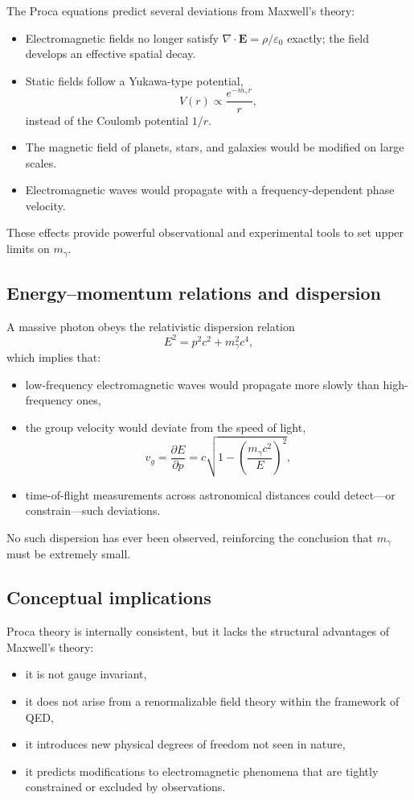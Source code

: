 The Proca equations predict several deviations from Maxwell’s theory:
\begin{itemize}
	\item Electromagnetic fields no longer satisfy $\nabla \cdot \mathbf{E} = \rho / \varepsilon_0$ 
	exactly; the field develops an effective spatial decay.
	\item Static fields follow a Yukawa-type potential,
	\[
	V(r) \propto \frac{e^{-m_\gamma r}}{r},
	\]
	instead of the Coulomb potential $1/r$.
	\item The magnetic field of planets, stars, and galaxies would be 
	modified on large scales.
	\item Electromagnetic waves would propagate with a frequency-dependent 
	phase velocity.
\end{itemize}

These effects provide powerful observational and experimental tools to 
set upper limits on $m_\gamma$.

\subsection*{Energy--momentum relations and dispersion}

A massive photon obeys the relativistic dispersion relation
\[
E^2 = p^2 c^2 + m_\gamma^2 c^4,
\]
which implies that:
\begin{itemize}
	\item low-frequency electromagnetic waves would propagate more slowly 
	than high-frequency ones,
	\item the group velocity would deviate from the speed of light,
	\[
	v_g = \frac{\partial E}{\partial p}
	= c \sqrt{1 - \left(\frac{m_\gamma c^2}{E}\right)^2},
	\]
	\item time-of-flight measurements across astronomical distances could 
	detect—or constrain—such deviations.
\end{itemize}

No such dispersion has ever been observed, reinforcing the conclusion 
that $m_\gamma$ must be extremely small.

\subsection*{Conceptual implications}

Proca theory is internally consistent, but it lacks the structural 
advantages of Maxwell’s theory:
\begin{itemize}
	\item it is not gauge invariant,
	\item it does not arise from a renormalizable field theory within the 
	framework of QED,
	\item it introduces new physical degrees of freedom not seen in nature,
	\item it predicts modifications to electromagnetic phenomena that are 
	tightly constrained or excluded by observations.
\end{itemize}

